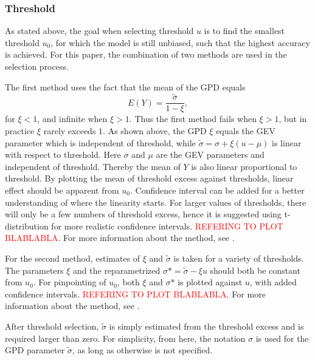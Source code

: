 \subsubsection{Threshold}
As stated above, the goal when selecting threshold $u$ is to find the smallest threshold $u_0$, for which the model is still unbiased, such that the highest accuracy is achieved. For this paper, the combination of two methods are used in the selection process. 

The first method uses the fact that the mean of the GPD equals 
\begin{equation}
E(Y)=\frac{\tilde{\sigma}}{1-\xi}, 
\end{equation}
for $\xi<1$, and infinite when $\xi>1$. Thus the first method fails when $\xi>1$, but in practice $\xi$ rarely exceeds $1$.
As shown above, the GPD $\xi$ equals the GEV parameter which is independent of threshold, while $\tilde{\sigma}=\sigma+\xi (u-\mu)$ is linear with respect to threshold. Here $\sigma$ and $\mu$ are the GEV parameters and independent of threshold.
Thereby the mean of $Y$ is also linear proportional to threshold. By plotting the mean of threshold excess against thresholds, linear effect should be apparent from $u_0$. Confidence interval can be added for a better understanding of where the linearity starts. For larger values of thresholds, there will only be a few numbers of threshold excess, hence it is suggested using t-distribution for more realistic confidence intervals. \textcolor{red}{REFERING TO PLOT BLABLABLA}. For more information about the method, see \cite[p.~79]{stuart}.

For the second method, estimates of $\xi$ and $\tilde{\sigma}$ is taken for a variety of thresholds. The parameters $\xi$ and the reparametrized $\sigma \mbox{*}=\tilde{\sigma}-\xi u$ should both be constant from $u_0$. For pinpointing of $u_0$, both $\xi$ and $\sigma \mbox{*}$ is plotted against $u$, with added confidence intervals.  \textcolor{red}{REFERING TO PLOT BLABLABLA}. For more information about the method, see \cite[p.~83]{stuart}.

After threshold selection, $\tilde{\sigma}$ is simply estimated from the threshold excess and is required larger than zero. For simplicity, from here, the notation $\sigma$ is used for the GPD parameter $\tilde{\sigma}$, as long as otherwise is not specified. 

